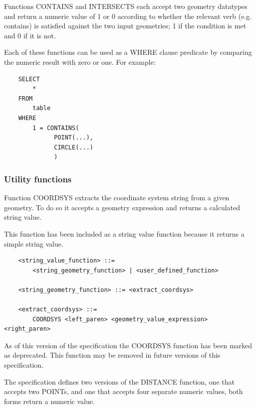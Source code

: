 \documentclass[11pt,a4paper]{ivoa}
\begin{document}
Functions CONTAINS and INTERSECTS each accept two geometry datatypes
and return a numeric value of 1 or 0 according to whether the relevant
verb (e.g. contains) is satisfied against the two input geometries;
1 if the condition is met and 0 if it is not.

Each of these functions can be used as a WHERE clause predicate by
comparing the numeric result with zero or one.
For example:
\begin{verbatim}
    SELECT
        *
    FROM
        table
    WHERE
        1 = CONTAINS(
              POINT(...),
              CIRCLE(...)
              )
\end{verbatim}


\subsubsection{Utility functions}
\label{sec:functions.geom.utility}

Function COORDSYS extracts the coordinate system string from a given
geometry. To do so it accepts a geometry expression and returns a calculated
string value.

This function has been included as a string value function because it
returns a simple string value.

\begin{verbatim}
    <string_value_function> ::=
        <string_geometry_function> | <user_defined_function>

    <string_geometry_function> ::= <extract_coordsys>

    <extract_coordsys> ::=
        COORDSYS <left_paren> <geometry_value_expression> <right_paren>
\end{verbatim}

As of this version of the specification the COORDSYS function has
been marked as deprecated. This function may be removed in future versions
of this specification.

The specification defines two versions of the DISTANCE function,
one that accepts two POINTs, and one that accepts four
separate numeric values, both forms return a numeric value.
\end{document}
